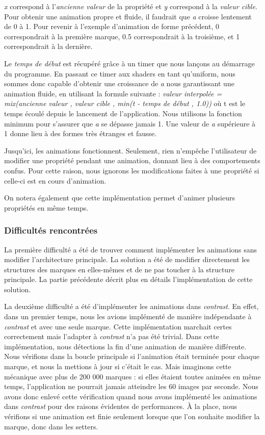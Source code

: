 \documentclass[12pt]{article}
\begin{document}
\textit{x} correspond à l'\textit{ancienne valeur} de la propriété et \textit{y} correspond à la 
\textit{valeur cible}.
Pour obtenir une animation propre et fluide, il faudrait que \textit{a} croisse lentement de 0 à 1.
Pour revenir à l'exemple d'animation de forme précédent, 0 correspondrait à la première marque, 0.5 
correspondrait à la troisième, et 1 correspondrait à la dernière.

Le \textit{temps de début} est récupéré grâce à un timer que nous lançons au démarrage du programme.
En passant ce timer aux shaders en tant qu'\gls{uniform}, nous sommes donc capable d'obtenir une croissance
de \textit{a} nous garantissant une animation fluide, en utilisant la formule suivante :
\textit{valeur interpolée = mix(ancienne valeur , valeur cible , min(t - temps de début , 1.0))} où t est 
le temps  écoulé depuis le lancement de l'application.
Nous utilisons la fonction minimum pour s'assurer que \textit{a} se dépasse jamais 1. Une valeur de 
\textit{a} supérieure à 1 donne lieu à des formes très étranges et fausse.

Jusqu'ici, les animations fonctionnent. Seulement, rien n'empêche l'utilisateur de modifier une propriété pendant une animation, donnant lieu à des comportements confus.
Pour cette raison, nous ignorons les modifications faites à une propriété si celle-ci est en cours
d'animation.

On notera également que cette implémentation permet d'animer plusieurs propriétés en même temps.

\subsubsection{Difficultés rencontrées}

La première difficulté a été de trouver comment implémenter les animations sans modifier l'architecture 
principale. La solution a été de modifier directement les structures des 
marques en elles-mêmes et de ne pas toucher à la structure principale. La partie précédente décrit plus en 
détails l'implémentation de cette solution.

La deuxième difficulté a été d'implémenter les animations dans \textit{contrast}.
En effet, dans un premier temps, nous les avions implémenté de manière indépendante à \textit{contrast} et avec une seule marque. Cette implémentation marchait certes correctement mais l'adapter à \textit{contrast} n'a pas été trivial.
Dans cette implémentation, nous détections la fin d'une animation de manière différente. Nous vérifions 
dans la boucle principale si l'animation était terminée pour chaque marque, et nous la mettions à jour si 
c'était le cas.
Mais imaginons cette mécanique avec plus de 200 000 marques : si elles étaient toutes animées en même 
temps, l'application ne pourrait jamais atteindre les 60 images par seconde.
Nous avons donc enlevé cette vérification quand nous avons implémenté les animations dans \textit{contrast}
pour des raisons évidentes de performances.
À la place, nous vérifions si une animation est finie seulement lorsque que l'on souhaite modifier la 
marque, donc dans les setters.
\end{document}
